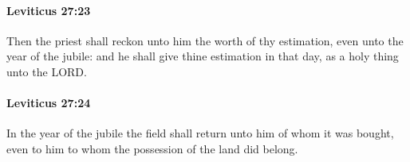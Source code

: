 		\paragraph{Leviticus 27:23} %
			\label{LEVITICUS-27-23}

			Then the priest shall reckon unto him the worth of thy estimation, even unto the year of the jubile: and he shall give thine estimation in that day, as a holy thing unto the LORD.


		\paragraph{Leviticus 27:24} %
			\label{LEVITICUS-27-24}

			In the year of the jubile the field shall return unto him of whom it was bought, even to him to whom the possession of the land did belong.


